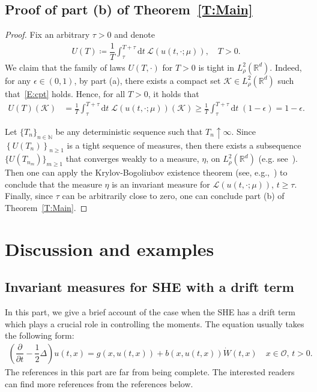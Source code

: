 \documentclass[sn-mathphys]{sn-jnl}%
\renewcommand{\R}{\mathbb{R}}
\newcommand{\ud}{\ensuremath{\mathrm{d}}}
\numberwithin{equation}{section}
\theoremstyle{thmstyleone}%
\theoremstyle{thmstyletwo}%
\theoremstyle{thmstylethree}%
\begin{document}
\subsection{Proof of part (b) of Theorem~\ref{T:Main}}
\begin{proof}
  Fix an arbitrary $\tau>0$ and denote
  \begin{align*}
    U(T) \coloneqq \dfrac{1}{T}\int_{\tau}^{T+\tau} \ud t\: \mathcal{L}\left(u(t,\cdot;\mu)\right), \quad T>0.
  \end{align*}
  We claim that the family of laws $U(T,\cdot)$ for $T > 0$ is tight in $L^2_{\rho}(\R^d)$. Indeed,
  for any $\epsilon\in (0,1)$, by part (a), there exists a compact set $\mathcal{K}\in L_\rho^2
  (\R^d)$ such that~\eqref{E:cpt} holds. Hence, for all $T>0$, it holds that
  \begin{align*}
    U(T)\left(\mathcal{K}\right)
    & = \frac{1}{T} \int_{\tau}^{T + \tau}  \ud t\; \mathscr{L}(u(t,\cdot;\mu))\left(\mathcal{K}\right)
      \ge \frac{1}{T} \int_{\tau}^{T + \tau}\ud t\;  (1-\epsilon)
      = 1-\epsilon.
  \end{align*}

  Let $\{T_n\}_{n\in \mathbb{N}}$ be any deterministic sequence such that $T_n\uparrow \infty$.
  Since $\left\{U(T_n)\right\}_{n\ge 1}$ is a tight sequence of measures, then there exists a
  subsequence $\{U\left(T_{n_m}\right)\}_{m\ge 1}$ that converges weakly to a measure, $\eta$, on
  $L_\rho^2 (\R^d)$ (e.g. see~\cite[Theorem 5.1]{billingsley:99:convergence}). Then one can apply
  the Krylov-Bogoliubov existence theorem (see, e.g.,~\cite[Theorem
  11.7]{da-prato.zabczyk:14:stochastic}) to conclude that the measure $\eta$ is an invariant measure
  for $\mathscr{L}(u(t,\cdot;\mu))$, $t\ge \tau$. Finally, since $\tau$ can be arbitrarily close to
  zero, one can conclude part (b) of Theorem~\ref{T:Main}.
\end{proof}


\section{Discussion and examples}\label{S:Example}
\subsection{Invariant measures for SHE with a drift term}\label{SS:Drift}

In this part, we give a brief account of the case when the SHE has a drift term which plays a
crucial role in controlling the moments. The equation usually takes the following form:
\begin{align}\label{E:Drift}
  \left(\dfrac{\partial}{\partial t}-\dfrac{1}{2}\Delta\right) u(t,x)
   = g(x,u(t,x)) + b(x,u(t,x)) \dot W(t,x) \quad \text{$x\in \mathcal{O}$, $t>0$}.
\end{align}
The references in this part are far from being complete. The interested readers can find more
references from the references below.
\end{document}
